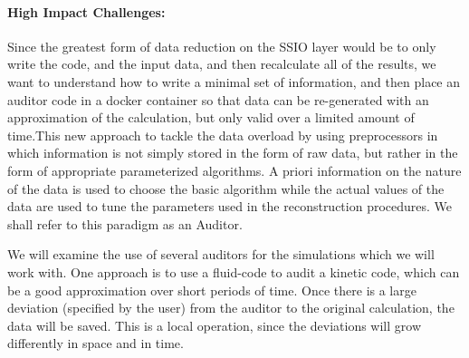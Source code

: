 \paragraph{High Impact Challenges:} Since the greatest form of data reduction
on the SSIO layer would be to only write the code, and the input data, and then
recalculate all of the results, we want to understand how to write a minimal
set of information, and then place an auditor code in a docker container so
that data can be re-generated with an approximation of the calculation, but
only valid over a limited amount of time.This new approach to tackle the data
overload by using preprocessors in which information is not simply stored in
the form of raw data, but rather in the form of appropriate parameterized
algorithms. A priori information on the nature of the data is used to choose
the basic algorithm while the actual values of the data are used to tune the
parameters used in the reconstruction procedures. We shall refer to this
paradigm as an Auditor.

We will examine the use of several auditors for the simulations which we will
work with. One approach is to use a fluid-code to audit a kinetic code, which
can be a good approximation over short periods of time. Once there is a large
deviation (specified by the user) from the auditor to the original calculation,
the data will be saved. This is a local operation, since the deviations will
grow differently in space and in time. 

